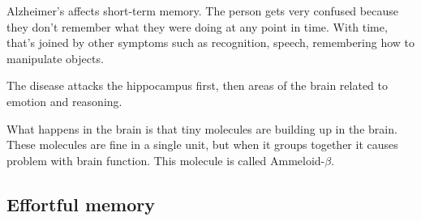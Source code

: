 \documentclass[12pt]{article}
\begin{document}
Alzheimer's affects short-term memory. The person gets very confused because
they don't remember what they were doing at any point in time. With time, that's
joined by other symptoms such as recognition, speech, remembering how to
manipulate objects.

The disease attacks the hippocampus first, then areas of the brain related to
emotion and reasoning.

What happens in the brain is that tiny molecules are building up in the brain.
These molecules are fine in a single unit, but when it groups together it causes
problem with brain function. This molecule is called Ammeloid-$\beta$.

\subsection{Effortful memory }
\end{document}
